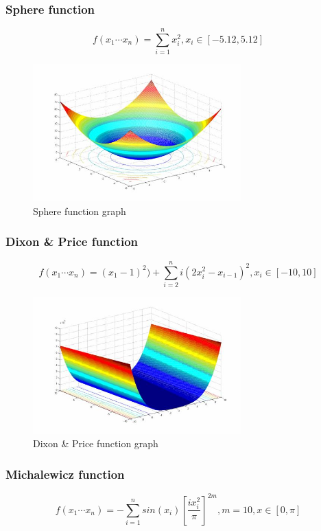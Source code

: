 \documentclass{article}
\begin{document}
	\subsubsection{Sphere function}
	$$f(x_1 \cdots x_n) = {\sum_{i=1}^{n} x_i^{2}}, x_i \in [-5.12, 5.12]$$

	\begin{figure}[!h]
		\includegraphics[height=150pt,keepaspectratio]{images/sphere-graph.jpg}
		\caption{Sphere function graph}
	\end{figure}

    
	\subsubsection{Dixon \& Price function}
	$$f(x_1 \cdots x_n) = (x_1 - 1)^2 ) + {\sum_{i=2}^{n} i(2x_i^{2} - x_{i-1})^2}, x_i \in [-10, 10]$$


	\begin{figure}[h]
		\includegraphics[height=150pt,keepaspectratio]{images/dixon-graph.jpg}
		\caption{Dixon \& Price function graph}
	\end{figure}

	\subsubsection{Michalewicz function}
	$$f(x_1 \cdots x_n) = -{\sum_{i=1}^{n} sin(x_i)\left[\frac{ix_i^2}{\pi}\right]^{2m}}, m = 10, x \in [0, \pi]$$
\end{document}
